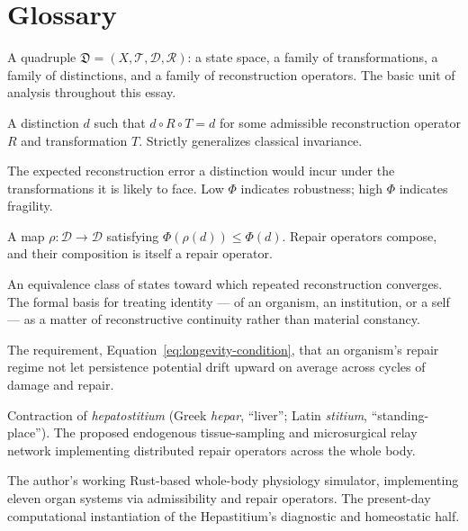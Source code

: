 \documentclass[12pt]{article}
\begin{document}
\section{Glossary}

\begin{description}[leftmargin=2.4cm, style=nextline]
\item[Structured Domain] A quadruple $\mathfrak{D} = (X, \mathcal{T}, \mathcal{D}, \mathcal{R})$: a state space, a family of transformations, a family of distinctions, and a family of reconstruction operators. The basic unit of analysis throughout this essay.

\item[Recoverable Distinction] A distinction $d$ such that $d \circ R \circ T = d$ for some admissible reconstruction operator $R$ and transformation $T$. Strictly generalizes classical invariance.

\item[Persistence Potential $\Phi(d)$] The expected reconstruction error a distinction would incur under the transformations it is likely to face. Low $\Phi$ indicates robustness; high $\Phi$ indicates fragility.

\item[Repair Operator] A map $\rho : \mathcal{D} \to \mathcal{D}$ satisfying $\Phi(\rho(d)) \le \Phi(d)$. Repair operators compose, and their composition is itself a repair operator.

\item[Persistence Attractor] An equivalence class of states toward which repeated reconstruction converges. The formal basis for treating identity --- of an organism, an institution, or a self --- as a matter of reconstructive continuity rather than material constancy.

\item[Longevity Condition] The requirement, Equation~\eqref{eq:longevity-condition}, that an organism's repair regime not let persistence potential drift upward on average across cycles of damage and repair.

\item[Hepastitium] Contraction of \emph{hepatostitium} (Greek \emph{hepar}, ``liver''; Latin \emph{stitium}, ``standing-place''). The proposed endogenous tissue-sampling and microsurgical relay network implementing distributed repair operators across the whole body.

\item[Physiome] The author's working Rust-based whole-body physiology simulator, implementing eleven organ systems via admissibility and repair operators. The present-day computational instantiation of the Hepastitium's diagnostic and homeostatic half.


\end{description}
\end{document}
